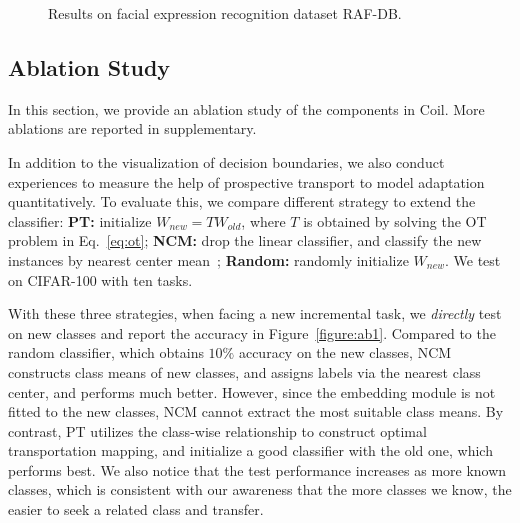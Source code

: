 \documentclass[sigconf]{acmart}
\newcommand{\mame}{{\sc Coil}}
\begin{document}
\begin{figure}[t]
	\begin{center}
	\end{center}
	\vspace{-3mm}
	\caption{\small Results on facial expression recognition dataset RAF-DB.  } \label{figure:rafdbresults}
	\vspace{-3mm}
\end{figure}

\subsection{Ablation Study}


In this section, we provide an ablation study of the components in \mame. More ablations are reported in supplementary. 

 In addition to the visualization of  decision boundaries,
we also conduct experiences to measure the help of prospective transport to model adaptation quantitatively. 
To evaluate this, we compare different strategy to extend the classifier: {\bf PT:} initialize $W_{new}=T{W_{old}}$, where $T$ is obtained by solving the OT problem in Eq.~\ref{eq:ot}; {\bf NCM:} drop the linear classifier, and classify the new instances by nearest center mean~\cite{rebuffi2017icarl}; {\bf Random:} randomly initialize $W_{new}$. We test on CIFAR-100 with ten tasks.

With these three strategies, when facing a new incremental task, we \emph{directly} test on new classes and report the accuracy in Figure~\ref{figure:ab1}. Compared to the random classifier, which obtains $10\%$ accuracy on the new classes, NCM constructs class means of new classes, and assigns labels via the nearest class center, and performs much better. However, since the embedding module is not fitted to the new classes, NCM cannot extract the most suitable class means. By contrast, PT utilizes the class-wise relationship to construct optimal transportation  mapping, and initialize a good classifier with the old one, which performs best. We also notice that the test performance increases as more known classes, which is consistent with our awareness that the more classes we know, the easier to seek a related class and transfer.
\end{document}
